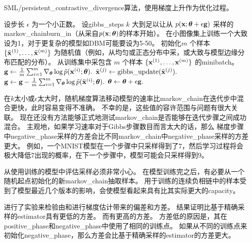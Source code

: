 \begin{algorithm}[ht]
\caption{\gls{SML}/\gls{persistent_contrastive_divergence}算法，使用梯度上升作为优化过程。}
\label{alg:sml}
\begin{algorithmic}
\STATE 设步长 $\epsilon$ 为一个小正数。
\STATE 设\gls{gibbs_steps} $k$ 大到足以让从 $p(\mathbf{x}; \boldsymbol{\theta} + \epsilon \mathbf{g})$ 采样的\gls{markov_chain}\gls{burn_in}（从采自$p(\mathbf{x}; \boldsymbol{\theta})$的样本开始）。
在小图像集上训练一个大致设为1，对于更复杂的模型如\gls{DBM}可能要设为5-50。
\STATE  初始化$m$ 个样本 $\{ \tilde{\mathbf{x}}^{(1)}, \dots, \tilde{\mathbf{x}}^{(m)} \}$ 为随机值（例如，从均匀或正态分布中采，或大致与模型边缘分布匹配的分布）。
\STATE 从训练集中采包含 $m$ 个样本 $\{ \mathbf{x}^{(1)}, \dots, \mathbf{x}^{(m)}\}$ 的\gls{minibatch}。
\STATE $\mathbf{g} \leftarrow \frac{1}{m} \sum_{i=1}^m \nabla_{\boldsymbol{\theta}} \log \tilde{p}(\mathbf{x}^{(i)}; \boldsymbol{\theta}).$
        \STATE $\tilde{\mathbf{x}}^{(j)} \leftarrow \text{gibbs\_update}(\tilde{\mathbf{x}}^{(j)}).$
    \ENDFOR
\ENDFOR
\STATE $\mathbf{g} \leftarrow \mathbf{g} - \frac{1}{m} \sum_{i=1}^m \nabla_{\boldsymbol{\theta}} \log \tilde{p}( \tilde{\mathbf{x}}^{(i)} ; \boldsymbol{\theta} ).$
\STATE $\boldsymbol{\theta} \leftarrow \boldsymbol{\theta} + \epsilon \mathbf{g}.$
\ENDWHILE
\end{algorithmic}
\end{algorithm}


在$k$太小或$\epsilon$太大时，随机梯度算法移动模型的速率比\gls{markov_chain}在迭代步中混合更快，此时容易变得不准确。
不幸的是，这些值的容许范围与问题有很大关联。
现在还没有方法能够正式地测试\gls{markov_chain}是否能够在迭代步骤之间成功混合。
主观地，如果学习速率对于Gibbs步骤数目而言太大的话，那么
梯度步骤中\gls{negative_phase}采样的方差会比不同\gls{markov_chain}中\gls{negative_phase}采样的方差更大。
例如，一个MNIST模型在一个步骤中只采样得到了$7$，然后学习过程将会极大降低$7$出现的概率，在下一个步骤中，模型可能会只采样得到$9$。


从使用训练的模型中评估采样必须非常小心。
在模型训练完之后，有必要从一个随机起点初始化的新\gls{markov_chain}抽取样本。
用于训练的连续负相链中的样本受到了模型最近几个版本的影响，会使模型看起来具有比其实际更大的\gls{capacity}。



\cite{BerglundR13}进行了实验来检验由和进行梯度估计带来的偏差和方差。
结果证明比基于精确采样的\gls{estimator}具有更低的方差。
而有更高的方差。
方差低的原因是，其在\gls{positive_phase}和\gls{negative_phase}中使用了相同的训练点。
如果从不同的训练点来初始化\gls{negative_phase}，那么方差会比基于精确采样的\gls{estimator}的方差更大。


